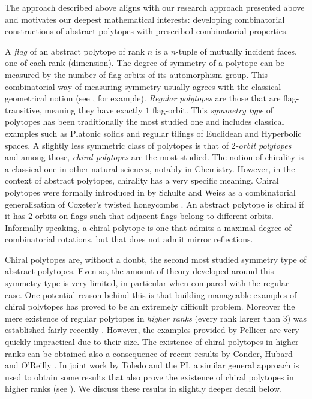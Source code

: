 \documentclass[a4paper,12pt,english]{article}
\begin{document}
The approach described above aligns with our research approach presented above and motivates our deepest mathematical interests: developing combinatorial constructions of abstract polytopes with prescribed combinatorial properties.





A \emph{flag} of an abstract polytope of rank $n$ is a $n$-tuple of mutually incident faces, one of each rank (dimension). 
The degree of symmetry of a polytope can be measured by the number of flag-orbits of its automorphism group.
This combinatorial way of measuring symmetry usually agrees with the classical geometrical notion (see \cite{DuVal1964_HomographiesQuaternionsRotations,Coxeter1973_RegularPolytopes,Coxeter1991_RegularComplexPolytopes}, for example).
\emph{Regular polytopes} are those that are flag-transitive, meaning they have exactly $1$ flag-orbit.
This \emph{symmetry type} of polytopes has been traditionally the most studied one and includes classical examples such as Platonic solids and regular tilings of Euclidean and Hyperbolic spaces.
A slightly less symmetric class of polytopes is that of \emph{$2$-orbit polytopes} and among those, \emph{chiral polytopes} are the most studied.
The notion of chirality is a classical one in other natural sciences, notably in Chemistry.
However, in the context of abstract polytopes, chirality has a very specific meaning. 
Chiral polytopes were formally introduced in \cite*{SchulWeiss1991_ChiralPolytopes} by Schulte and Weiss as a combinatorial generalisation of Coxeter's twisted honeycombs \cite*{Coxeter1970_TwistedHoneycombs}.
An abstract polytope is chiral if it has $2$ orbits on flags such that adjacent flags belong to different orbits. 
Informally speaking, a chiral polytope is one that admits a maximal degree of combinatorial rotations, but that does not admit mirror reflections.

Chiral polytopes are, without a doubt, the second most studied symmetry type of abstract polytopes. 
Even so, the amount of theory developed around this symmetry type is very limited, in particular when compared with the regular case. 
One potential reason behind this is that building manageable examples of chiral polytopes has proved to be an extremely difficult problem. 
Moreover the mere existence of regular polytopes in \emph{higher ranks} (every rank larger than $3$) was established fairly recently \cite{Pellicer2010_ConstructionHigherRank}. 
However, the examples provided by Pellicer are very quickly impractical due to their size.
The existence of chiral polytopes in higher ranks can be obtained also a consequence of recent results by Conder, Hubard and O'Reilly \cite*{CondHubORe2024_ConstructionChiralPolytopes}.
In joint work by Toledo and the PI, a similar general approach is used to obtain some results that also prove the existence of chiral polytopes in higher ranks (see \cite{MonteToled_ChiralExtensionsRegular_preprint}). 
We discuss these results in slightly deeper detail below.
\end{document}
